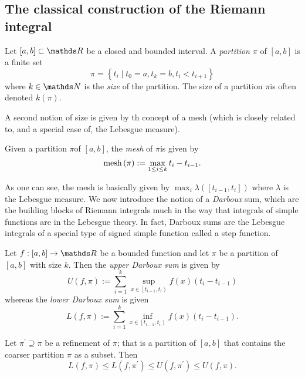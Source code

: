 \subsection{The classical construction of the Riemann integral}
\begin{defn}
\label{def:partitionInterval}Let $\left[a,b\right]\subset\R$ be
a closed and bounded interval. A \emph{partition $\pi$ }of $\left[a,b\right]$
is a finite set
\[
\pi=\left\{ t_{i}\mid t_{0}=a,t_{k}=b,t_{i}<t_{i+1}\right\} 
\]
where $k\in\N$ is the \emph{size }of the partition. The size of a
partition $\pi$is often denoted $k\left(\pi\right).$
\end{defn}

A second notion of size is given by th concept of a mesh (which is
closely related to, and a special case of, the Lebesgue measure).
\begin{defn}
\label{def:meshPartition}Given a partition $\pi$of $\left[a,b\right]$,
the\emph{ mesh }of $\pi$is given by 
\[
\mathrm{mesh}\left(\pi\right):=\max_{1\leq i\leq k}t_{i}-t_{i-1}.
\]
\end{defn}

As one can see, the mesh is basically given by $\max_{i}\lambda\left(\left[t_{i-1},t_{i}\right]\right)$
where $\lambda$ is the Lebesgue measure. We now introduce the notion
of a \emph{Darboux }sum, which are the building blocks of Riemann
integrals much in the way that integrals of simple functions are in
the Lebesgue theory. In fact, Darboux sums are the Lebesgue integrals
of a special type of signed simple function called a step function.
\begin{defn}
\label{def:darbouxSums}Let $f:\left[a,b\right]\to\R$ be a bounded
function and let $\pi$ be a partition of $\left[a,b\right]$ with
size $k.$ Then the \emph{upper Darboux sum }is given by 
\[
U\left(f,\pi\right):=\sum_{i=1}^{k}\sup_{x\in\left[t_{i-1},t_{i}\right)}f\left(x\right)\left(t_{i}-t_{i-1}\right)
\]
whereas the \emph{lower Darboux sum }is given
\[
L\left(f,\pi\right):=\sum_{i=1}^{k}\inf_{x\in\left[t_{i-1},t_{i}\right)}f\left(x\right)\left(t_{i}-t_{i-1}\right).
\]
\end{defn}

\begin{prop}
\label{prop:darbouxSumInequality}Let $\pi^{\prime}\supseteq\pi$
be a refinement of $\pi$; that is a partition of $\left[a,b\right]$
that contains the coarser partition $\pi$ as a subset. Then
\[
L\left(f,\pi\right)\leq L\left(f,\pi^{\prime}\right)\leq U\left(f,\pi^{\prime}\right)\leq U\left(f,\pi\right).
\]
\end{prop}

